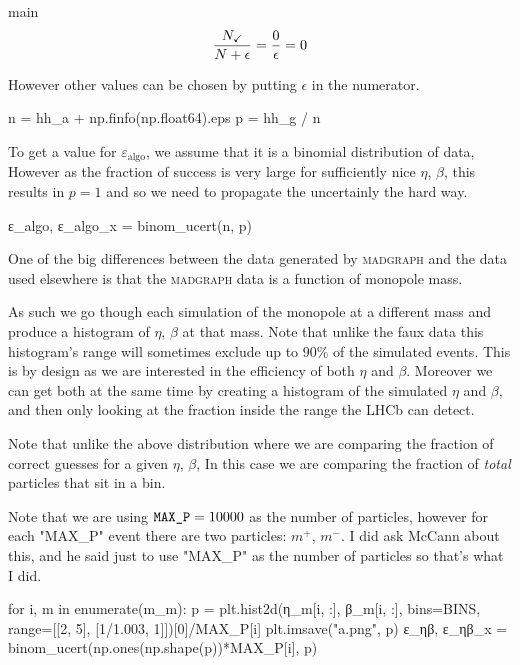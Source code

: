 \documentclass[10pt, a4paper]{article}
\begin{document}
\begin{codeblock}{main}
\begin{equation}
 \frac{N_\text{\checkmark}}{N + \epsilon} = \frac{0}{\epsilon} = 0 
\end{equation}

However other values can be chosen by putting $\epsilon$ in the numerator.

\begin{code}
	n = hh_a + np.finfo(np.float64).eps
	p = hh_g / n 
\end{code}

To get a value for $\varepsilon_\text{algo}$, we assume that it is a binomial distribution of data, However as the fraction of success is very large for sufficiently nice $\eta$, $\beta$, this results in $p=1$ and so we need to propagate the uncertainly the hard way.

\begin{code}
	ε_algo, ε_algo_x = binom_ucert(n, p)
\end{code}

One of the big differences between the data generated by \textsc{madgraph} and the data used elsewhere is that the \textsc{madgraph} data is a function of monopole mass. 

As such we go though each simulation of the monopole at a different mass and produce a histogram of $\eta$, $\beta$ at that mass. 
Note that unlike the faux data this histogram's range will sometimes exclude up to $90\%$ of the simulated events. This is by design as we are interested in the efficiency of both $\eta$ and $\beta$. Moreover we can get both at the same time by creating a histogram of the simulated $\eta$ and $\beta$, and then only looking at the fraction inside the range the LHCb can detect. 

Note that unlike the above distribution where we are comparing the fraction of correct guesses for a given $\eta$, $\beta$, In this case we are comparing the fraction of \emph{total} particles that sit in a bin.

Note that we are using $\text{\texttt{MAX\_P}}=10000$ as the number of particles, however for each "MAX_P" event there are two particles: $m^+$, $m^-$. I did ask McCann about this, and he said just to use "MAX_P" as the number of particles so that's what I did.

\begin{code}
	for i, m in enumerate(m_m):
		p = plt.hist2d(η_m[i, :],
		               β_m[i, :],
		               bins=BINS,
		               range=[[2, 5], [1/1.003, 1]])[0]/MAX_P[i]
		plt.imsave("a.png", p)
		ε_ηβ, ε_ηβ_x = binom_ucert(np.ones(np.shape(p))*MAX_P[i], p)
\end{code}


\end{codeblock}
\end{document}
